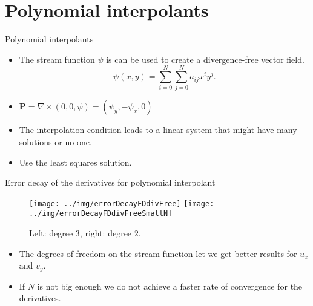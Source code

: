 \documentclass{beamer}
\begin{document}
\section{Polynomial interpolants}
\begin{frame}{Polynomial interpolants}
  \begin{itemize}
    \item The stream function $\psi$ is can be used to create a divergence-free
      vector field.
      \begin{equation*}
	\psi(x,y) = \sum_{i=0}^N\sum_{j=0}^N a_{ij}x^i y^j.
      \end{equation*}
    
    \item $\mathbf{P} = \nabla \times (0,0,\psi) = (\psi_y,-\psi_x,0)$

    \item The interpolation condition leads to a linear system that might have
      many solutions or no one.

    \item Use the least squares solution.
  \end{itemize}
\end{frame}

\begin{frame}{Error decay of the derivatives for polynomial interpolant}
  \begin{figure}[htb]
    \begin{center}
      \texttt{[image: ../img/errorDecayFDdivFree]}
      \texttt{[image: ../img/errorDecayFDdivFreeSmallN]}
    \end{center}
    \caption{Left: degree $3$, right: degree $2$.}
  \end{figure}
  
  \begin{itemize}
    \item The degrees of freedom on the stream function let we get better
      results for $u_x$ and $v_y$.
      
    \item If $N$ is not big enough we do not achieve a faster rate of
      convergence for the derivatives.
  \end{itemize}
\end{frame}
\end{document}
